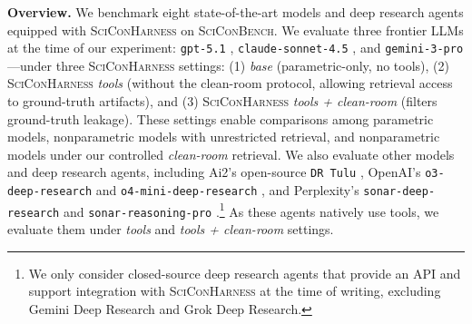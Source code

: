 \documentclass{article}
\newcommand{\xhdr}[1]{%
  \noindent\textbf{#1.}
}
\begin{document}
\xhdr{Overview} We benchmark eight state-of-the-art models and deep research agents equipped with \textsc{SciConHarness} on  \textsc{SciConBench}. We evaluate three frontier LLMs at the time of our experiment: \texttt{gpt-5.1} \cite{openai_gpt51_model}, \texttt{claude-sonnet-4.5} \cite{anthropic_system_prompts_release_notes}, and \texttt{gemini-3-pro} \cite{google_gemini3pro_vertexai}---under three \textsc{SciConHarness} settings: (1) \textit{base} (parametric-only, no tools), (2) \textsc{SciConHarness} \textit{tools} (without the clean-room protocol, allowing retrieval access to ground-truth artifacts), and (3) \textsc{SciConHarness} \textit{tools + clean-room} (filters ground-truth leakage). These settings enable comparisons among parametric models, nonparametric models with unrestricted retrieval, and nonparametric models under our controlled \textit{clean-room} retrieval. We also evaluate other models and deep research agents, including Ai2's open-source \texttt{DR Tulu} \cite{shao2025drtulureinforcementlearning}, OpenAI's \texttt{o3-deep-research} \cite{openai_o3_deep_research} and \texttt{o4-mini-deep-research} \cite{openai_o4mini_deep_research}, and Perplexity's \texttt{sonar-deep-research} \cite{perplexity_sonar_deep_research} and \texttt{sonar-reasoning-pro} \cite{perplexity_sonar_reasoning_pro}.\footnote{We only consider closed-source deep research agents that provide an API and support integration with \textsc{SciConHarness} at the time of writing, excluding Gemini Deep Research and Grok Deep Research.} As these agents natively use tools, we evaluate them under \textit{tools} and \textit{tools + clean-room} settings.
\end{document}
